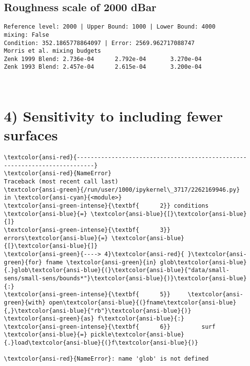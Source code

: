 \documentclass[11pt]{article}
\begin{document}
    \hypertarget{roughness-scale-of-2000-dbar}{%
\subsection{Roughness scale of 2000
dBar}\label{roughness-scale-of-2000-dbar}}

    \begin{Verbatim}[commandchars=\\\{\}]
Reference level: 2000 | Upper Bound: 1000 | Lower Bound: 4000
mixing: False
Condition: 352.1865778864097 | Error: 2569.962717088747
Morris et al. mixing budgets
Zenk 1999 Blend: 2.736e-04      2.792e-04       3.270e-04
Zenk 1993 Blend: 2.457e-04      2.615e-04       3.200e-04
    \end{Verbatim}

    \begin{center}
    \end{center}
    { \hspace*{\fill} \\}
    
    \hypertarget{sensitivity-to-including-fewer-surfaces}{%
\section{4) Sensitivity to including fewer
surfaces}\label{sensitivity-to-including-fewer-surfaces}}

    \begin{Verbatim}[commandchars=\\\{\}, frame=single, framerule=2mm, rulecolor=\color{outerrorbackground}]
\textcolor{ansi-red}{---------------------------------------------------------------------------}
\textcolor{ansi-red}{NameError}                                 Traceback (most recent call last)
\textcolor{ansi-green}{/run/user/1000/ipykernel\_3717/2262169946.py} in \textcolor{ansi-cyan}{<module>}
\textcolor{ansi-green-intense}{\textbf{      2}} conditions \textcolor{ansi-blue}{=} \textcolor{ansi-blue}{[}\textcolor{ansi-blue}{]}
\textcolor{ansi-green-intense}{\textbf{      3}} errors\textcolor{ansi-blue}{=} \textcolor{ansi-blue}{[}\textcolor{ansi-blue}{]}
\textcolor{ansi-green}{----> 4}\textcolor{ansi-red}{ }\textcolor{ansi-green}{for} fname \textcolor{ansi-green}{in} glob\textcolor{ansi-blue}{.}glob\textcolor{ansi-blue}{(}\textcolor{ansi-blue}{"data/small-sens/small-sens/bounds*"}\textcolor{ansi-blue}{)}\textcolor{ansi-blue}{:}
\textcolor{ansi-green-intense}{\textbf{      5}}     \textcolor{ansi-green}{with} open\textcolor{ansi-blue}{(}fname\textcolor{ansi-blue}{,}\textcolor{ansi-blue}{"rb"}\textcolor{ansi-blue}{)} \textcolor{ansi-green}{as} f\textcolor{ansi-blue}{:}
\textcolor{ansi-green-intense}{\textbf{      6}}         surf \textcolor{ansi-blue}{=} pickle\textcolor{ansi-blue}{.}load\textcolor{ansi-blue}{(}f\textcolor{ansi-blue}{)}

\textcolor{ansi-red}{NameError}: name 'glob' is not defined
    \end{Verbatim}


    
    
    
\end{document}
